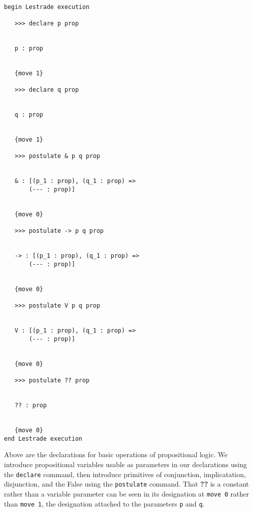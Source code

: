 \documentclass[12pt]{article}
\begin{document}
\begin{verbatim}

begin Lestrade execution

   >>> declare p prop


   p : prop


   {move 1}

   >>> declare q prop


   q : prop


   {move 1}

   >>> postulate & p q prop


   & : [(p_1 : prop), (q_1 : prop) => 
       (--- : prop)]


   {move 0}

   >>> postulate -> p q prop


   -> : [(p_1 : prop), (q_1 : prop) => 
       (--- : prop)]


   {move 0}

   >>> postulate V p q prop


   V : [(p_1 : prop), (q_1 : prop) => 
       (--- : prop)]


   {move 0}

   >>> postulate ?? prop


   ?? : prop


   {move 0}
end Lestrade execution
\end{verbatim}

Above are the declarations for basic operations of propositional logic.  We introduce propositional variables usable as parameters in our declarations using the {\tt declare\/} command, then
introduce primitives of conjunction, implicatation, disjunction, and the False using the {\tt postulate\/} command.  That {\bf ??} is a constant rather than a variable parameter
can be seen in its designation at {\tt move 0\/} rather than {\tt move 1\/}, the designation attached to the parameters {\tt p} and {\tt q\/}.
\end{document}
